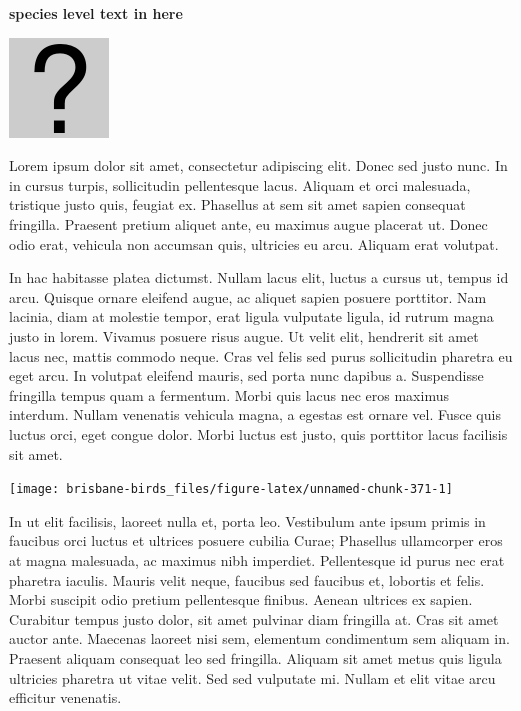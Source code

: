 \documentclass[]{book}
\let\origfigure\figure
\let\endorigfigure\endfigure
\renewenvironment{figure}[1][2] {
  \expandafter\origfigure\expandafter[H]
} {
  \endorigfigure
}
\begin{document}
\textbf{species level text in here}

\begin{figure}
\centering
\includegraphics{assets/missing.png}
\caption{No image for species}
\end{figure}

Lorem ipsum dolor sit amet, consectetur adipiscing elit. Donec sed justo
nunc. In in cursus turpis, sollicitudin pellentesque lacus. Aliquam et
orci malesuada, tristique justo quis, feugiat ex. Phasellus at sem sit
amet sapien consequat fringilla. Praesent pretium aliquet ante, eu
maximus augue placerat ut. Donec odio erat, vehicula non accumsan quis,
ultricies eu arcu. Aliquam erat volutpat.

In hac habitasse platea dictumst. Nullam lacus elit, luctus a cursus ut,
tempus id arcu. Quisque ornare eleifend augue, ac aliquet sapien posuere
porttitor. Nam lacinia, diam at molestie tempor, erat ligula vulputate
ligula, id rutrum magna justo in lorem. Vivamus posuere risus augue. Ut
velit elit, hendrerit sit amet lacus nec, mattis commodo neque. Cras vel
felis sed purus sollicitudin pharetra eu eget arcu. In volutpat eleifend
mauris, sed porta nunc dapibus a. Suspendisse fringilla tempus quam a
fermentum. Morbi quis lacus nec eros maximus interdum. Nullam venenatis
vehicula magna, a egestas est ornare vel. Fusce quis luctus orci, eget
congue dolor. Morbi luctus est justo, quis porttitor lacus facilisis sit
amet.

\begin{figure}
\texttt{[image: brisbane-birds\_files/figure-latex/unnamed-chunk-371-1]} \caption{insert figure caption}\label{fig:unnamed-chunk-371}
\end{figure}

In ut elit facilisis, laoreet nulla et, porta leo. Vestibulum ante ipsum
primis in faucibus orci luctus et ultrices posuere cubilia Curae;
Phasellus ullamcorper eros at magna malesuada, ac maximus nibh
imperdiet. Pellentesque id purus nec erat pharetra iaculis. Mauris velit
neque, faucibus sed faucibus et, lobortis et felis. Morbi suscipit odio
pretium pellentesque finibus. Aenean ultrices ex sapien. Curabitur
tempus justo dolor, sit amet pulvinar diam fringilla at. Cras sit amet
auctor ante. Maecenas laoreet nisi sem, elementum condimentum sem
aliquam in. Praesent aliquam consequat leo sed fringilla. Aliquam sit
amet metus quis ligula ultricies pharetra ut vitae velit. Sed sed
vulputate mi. Nullam et elit vitae arcu efficitur venenatis.
\end{document}
